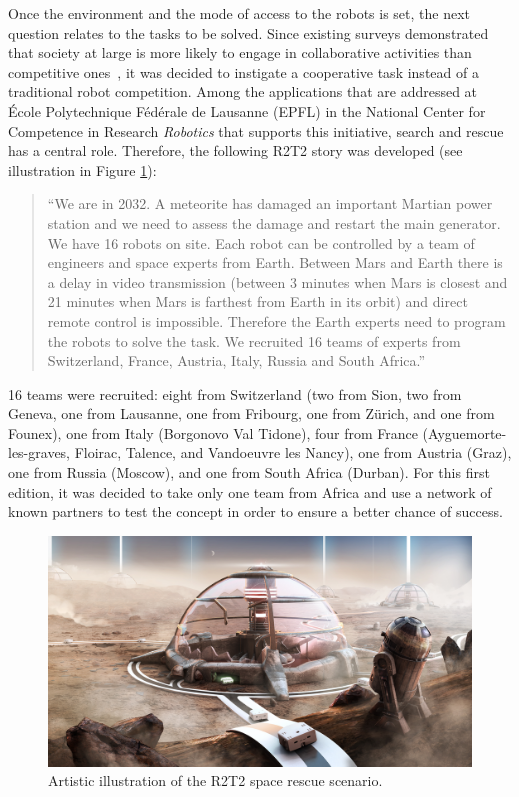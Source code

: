 \documentclass{intech-journal}
\begin{document}
Once the environment and the mode of access to the robots is set, the next question relates to the tasks to be solved.
Since existing surveys demonstrated that society at large is more likely to engage in collaborative activities than competitive ones~\cite{riedo2013upgrade}, it was decided to instigate a cooperative task instead of a traditional robot competition. 
Among the applications that are addressed at École Polytechnique Fédérale de Lausanne (EPFL) in the National Center for Competence in Research \textit{Robotics} that supports this initiative, search and rescue has a central role.
Therefore, the following R2T2 story was developed (see illustration in Figure \ref{fig:illustration}):
\begin{quotation}
``We are in 2032. A meteorite has damaged an important Martian power station and we need to assess the damage and restart the main generator. We have 16 robots on site. Each robot can be controlled by a team of engineers and space experts from Earth. Between Mars and Earth there is a delay in video transmission (between 3 minutes when Mars is closest and 21 minutes when Mars is farthest from Earth in its orbit) and direct remote control is impossible. Therefore the Earth experts need to program the robots to solve the task. We recruited 16 teams of experts from Switzerland, France, Austria, Italy, Russia and South Africa.''
\end{quotation}
16 teams were recruited: eight from Switzerland (two from Sion, two from Geneva, one from Lausanne, one from Fribourg, one from Z\"urich, and one from Founex), one from Italy (Borgonovo Val Tidone), four from France (Ayguemorte-les-graves, Floirac, Talence, and Vandoeuvre les Nancy), one from Austria (Graz), one from Russia (Moscow), and one from South Africa (Durban). 
For this first edition, it was decided to take only one team from Africa and use a network of known partners to test the concept in order to ensure a better chance of success.

\begin{figure}[ht]
 \centering
    \includegraphics[width=0.65\columnwidth]{figures/r2t2_illu.jpg}
  \caption{Artistic illustration of the R2T2 space rescue scenario.}
  \label{fig:illustration} 
\end{figure}
\end{document}
